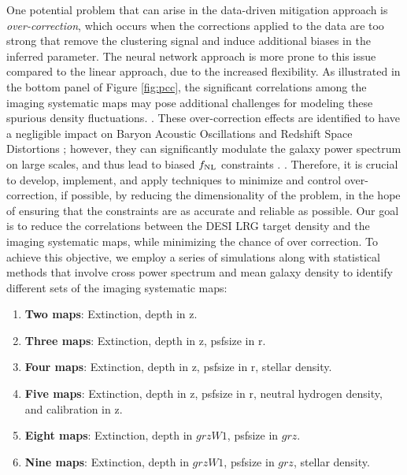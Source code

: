 One potential problem that can arise in the data-driven mitigation approach is \textit{over-correction}, which occurs when the corrections applied to the data are too strong that remove the clustering signal and induce additional biases in the inferred parameter. The neural network approach is more prone to this issue compared to the linear approach, due to the increased flexibility. As illustrated in the bottom panel of Figure \ref{fig:pcc}, the significant correlations among the imaging systematic maps may pose additional challenges for modeling these spurious density fluctuations. . These over-correction effects are identified to have a negligible impact on Baryon Acoustic Oscillations and Redshift Space Distortions \citep{merz2021clustering}; however, they can significantly modulate the galaxy power spectrum on large scales, and thus lead to biased $f_{\rm NL}$ constraints \citep{rezaie2021primordial, mueller2022primordial}. . Therefore, it is crucial to develop, implement, and apply techniques to minimize and control over-correction, if possible, by reducing the dimensionality of the problem, in the hope of ensuring that the constraints are as accurate and reliable as possible. Our goal is to reduce the correlations between the DESI LRG target density and the imaging systematic maps, while minimizing the chance of over correction.  To achieve this objective, we employ a series of simulations along with statistical methods that involve cross power spectrum and mean galaxy density to identify different sets of the imaging systematic maps: 
\begin{enumerate}[itemindent=*]
\item \textbf{Two maps}: Extinction, depth in z.
\item \textbf{Three maps}: Extinction, depth in z, psfsize in r.
\item \textbf{Four maps}: Extinction, depth in z, psfsize in r, stellar density.
\item \textbf{Five maps}: Extinction, depth in z, psfsize in r, neutral hydrogen density, and calibration in z.
\item \textbf{Eight maps}: Extinction, depth in $grzW1$, psfsize in $grz$.
\item \textbf{Nine maps}: Extinction, depth in $grzW1$, psfsize in $grz$, stellar density.
\end{enumerate}

